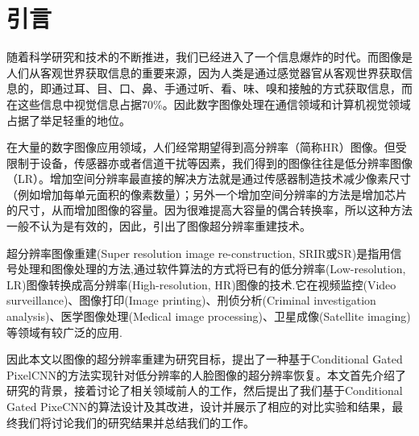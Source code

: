 \section{引言}
随着科学研究和技术的不断推进，我们已经进入了一个信息爆炸的时代。而图像是人们从客观世界获取信息的重要来源，因为人类是通过感觉器官从客观世界获取信息的，即通过耳、目、口、鼻、手通过听、看、味、嗅和接触的方式获取信息，而在这些信息中视觉信息占据70\%\cite{zhy2007review}。因此数字图像处理在通信领域和计算机视觉领域占据了举足轻重的地位。

在大量的数字图像应用领域，人们经常期望得到高分辨率（简称HR）图像。但受限制于设备，传感器亦或者信道干扰等因素，我们得到的图像往往是低分辨率图像（LR）。增加空间分辨率最直接的解决方法就是通过传感器制造技术减少像素尺寸（例如增加每单元面积的像素数量）；另外一个增加空间分辨率的方法是增加芯片的尺寸，从而增加图像的容量。因为很难提高大容量的偶合转换率，所以这种方法一般不认为是有效的，因此，引出了图像超分辨率重建技术。

超分辨率图像重建(Super resolution image re-construction, SRIR或SR)是指用信号处理和图像处理的方法,通过软件算法的方式将已有的低分辨率(Low-resolution, LR)图像转换成高分辨率(High-resolution, HR)图像的技术.它在视频监控(Video surveillance)、图像打印(Image printing)、刑侦分析(Criminal investigation analysis)、医学图像处理(Medical image processing)、卫星成像(Satellite imaging)等领域有较广泛的应用\cite{Su2013review}. 

因此本文以图像的超分辨率重建为研究目标，提出了一种基于Conditional Gated PixelCNN的方法实现针对低分辨率的人脸图像的超分辨率恢复。本文首先介绍了研究的背景，接着讨论了相关领域前人的工作，然后提出了我们基于Conditional Gated PixeCNN的算法设计及其改进，设计并展示了相应的对比实验和结果，最终我们将讨论我们的研究结果并总结我们的工作。